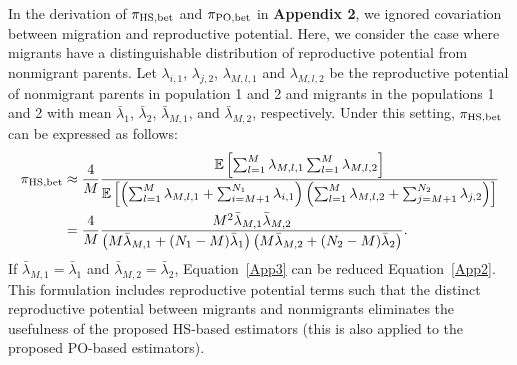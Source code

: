 \documentclass[12pt, English]{article}
\begin{document}
\begin{spacing}{1.9}
In the derivation of $\pi_{\rm HS,bet}$ and $\pi_{\rm PO,bet}$ in {\bf Appendix 2}, we ignored covariation between migration and reproductive potential. Here, we consider the case where migrants have a distinguishable distribution of reproductive potential from nonmigrant parents. Let $\lambda_{i,1}$, $\lambda_{j,2}$, $\lambda_{M,l,1}$ and $\lambda_{M,l,2}$ be the reproductive potential of nonmigrant parents in population 1 and 2 and migrants in the populations 1 and 2 with mean ${\bar \lambda_{1}}$, ${\bar \lambda_{2}}$, ${\bar \lambda_{M,1}}$, and ${\bar \lambda_{M,2}}$, respectively. Under this setting, $\pi_{\rm HS,bet}$ can be expressed as follows:
\begin{align}
\pi_{\rm HS,bet} &\approx \frac{4}{M}  \frac{ \mathbb{E}\left[ \sum_{l=1}^M \lambda_{M,l,1} \sum_{l=1}^M \lambda_{M,l,2} \right]} {\mathbb{E}\left[ \left(\sum_{l=1}^{M} \lambda_{M,l,1} + \sum_{i=M+1}^{N_1} \lambda_{i,1}\right) \left(\sum_{l=1}^{M} \lambda_{M,l,2} + \sum_{j=M+1}^{N_2} \lambda_{j,2}\right) \right] }\nonumber\\ 
&= \frac{4}{M} \frac{ M^2 {\bar \lambda_{M,1}} {\bar \lambda_{M,2}} } { \left( M {\bar \lambda_{M,1}} + (N_1 - M) {\bar \lambda_1} \right) \left( M {\bar \lambda_{M,2}} + (N_2 - M) {\bar \lambda_2} \right)}.
\label{App3}
\end{align}
If ${\bar \lambda_{M,1}} = {\bar \lambda_{1}}$ and ${\bar \lambda_{M,2}} = {\bar \lambda_{2}}$, Equation~\ref{App3} can be reduced Equation~\ref{App2}. This formulation includes reproductive potential terms such that the distinct reproductive potential between migrants and nonmigrants eliminates the usefulness of the proposed HS-based estimators (this is also applied to the proposed PO-based estimators). 

\clearpage




\end{spacing}
\end{document}
